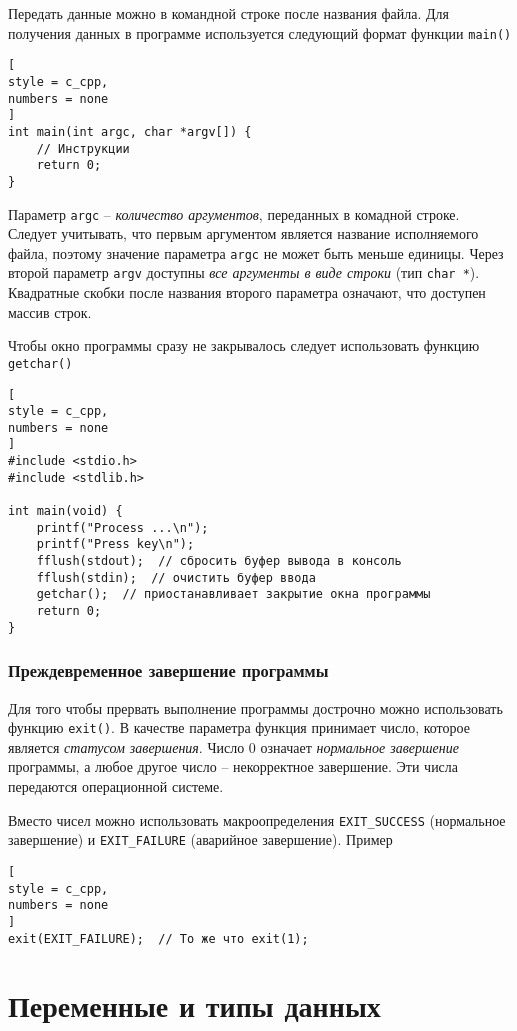 \documentclass[%
	11pt,
	a4paper,
	utf8,
		]{article}
\begin{document}
Передать данные можно в командной строке после названия файла. Для получения данных в программе используется следующий формат функции \verb|main()|
\begin{lstlisting}[
style = c_cpp,
numbers = none
]
int main(int argc, char *argv[]) {
    // Инструкции
    return 0;
}
\end{lstlisting}

Параметр \verb|argc| -- \emph{количество аргументов}, переданных в комадной строке. Следует учитывать, что первым аргументом является название исполняемого файла, поэтому значение параметра \verb*|argc| не может быть меньше единицы. Через второй параметр \verb*|argv| доступны \emph{все аргументы в виде строки} (тип \verb|char *|). Квадратные скобки после названия второго параметра означают, что доступен массив строк.

Чтобы окно программы сразу не закрывалось следует использовать функцию \verb|getchar()|
\begin{lstlisting}[
style = c_cpp,
numbers = none
]
#include <stdio.h>
#include <stdlib.h>

int main(void) {
    printf("Process ...\n");
    printf("Press key\n");
    fflush(stdout);  // сбросить буфер вывода в консоль
    fflush(stdin);  // очистить буфер ввода
    getchar();  // приостанавливает закрытие окна программы
    return 0;
}
\end{lstlisting}

\subsubsection{Преждевременное завершение программы}

Для того чтобы прервать выполнение программы дострочно можно использовать функцию \verb*|exit()|. В качестве параметра функция принимает число, которое является \emph{статусом завершения}. Число 0 означает \emph{нормальное завершение} программы, а любое другое число -- некорректное завершение. Эти числа передаются операционной системе.

Вместо чисел можно использовать макроопределения \verb|EXIT_SUCCESS| (нормальное завершение) и \verb*|EXIT_FAILURE| (аварийное завершение). Пример
\begin{lstlisting}[
style = c_cpp,
numbers = none
]
exit(EXIT_FAILURE);  // То же что exit(1);
\end{lstlisting}



\section{Переменные и типы данных}
\end{document}
